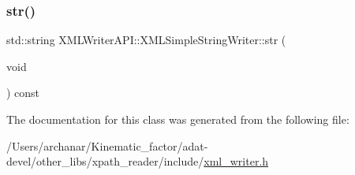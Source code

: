 \mbox{\label{classXMLWriterAPI_1_1XMLSimpleStringWriter_ae316d9565925e9605c38eb0a14e99e90}} 
\subsubsection{\texorpdfstring{str()}{str()}\hspace{0.1cm}{\footnotesize\ttfamily [3/3]}}
{\footnotesize\ttfamily std\+::string X\+M\+L\+Writer\+A\+P\+I\+::\+X\+M\+L\+Simple\+String\+Writer\+::str (\begin{DoxyParamCaption}\item[{void}]{ }\end{DoxyParamCaption}) const\hspace{0.3cm}{\ttfamily [inline]}}



The documentation for this class was generated from the following file\+:\begin{DoxyCompactItemize}
\item 
/\+Users/archanar/\+Kinematic\+\_\+factor/adat-\/devel/other\+\_\+libs/xpath\+\_\+reader/include/\mbox{\hyperlink{adat-devel_2other__libs_2xpath__reader_2include_2xml__writer_8h}{xml\+\_\+writer.\+h}}\end{DoxyCompactItemize}
